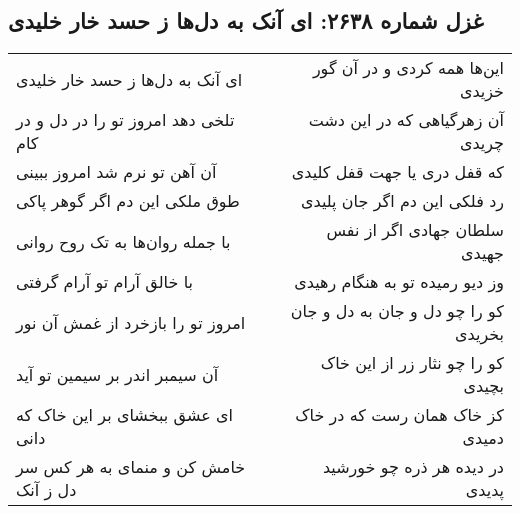 \begin{center}
\section*{غزل شماره ۲۶۳۸: ای آنک به دل‌ها ز حسد خار خلیدی}
\label{sec:2638}
\begin{longtable}{l p{0.5cm} r}
ای آنک به دل‌ها ز حسد خار خلیدی
&&
این‌ها همه کردی و در آن گور خزیدی
\\
تلخی دهد امروز تو را در دل و در کام
&&
آن زهرگیاهی که در این دشت چریدی
\\
آن آهن تو نرم شد امروز ببینی
&&
که قفل دری یا جهت قفل کلیدی
\\
طوق ملکی این دم اگر گوهر پاکی
&&
رد فلکی این دم اگر جان پلیدی
\\
با جمله روان‌ها به تک روح روانی
&&
سلطان جهادی اگر از نفس جهیدی
\\
با خالق آرام تو آرام گرفتی
&&
وز دیو رمیده تو به هنگام رهیدی
\\
امروز تو را بازخرد از غمش آن نور
&&
کو را چو دل و جان به دل و جان بخریدی
\\
آن سیمبر اندر بر سیمین تو آید
&&
کو را چو نثار زر از این خاک بچیدی
\\
ای عشق ببخشای بر این خاک که دانی
&&
کز خاک همان رست که در خاک دمیدی
\\
خامش کن و منمای به هر کس سر دل ز آنک
&&
در دیده هر ذره چو خورشید پدیدی
\\
\end{longtable}
\end{center}
